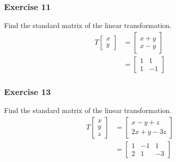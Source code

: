 \documentclass[letterpaper, 12pt]{math}
\begin{document}
\subsubsection*{Exercise 11}
Find the standard matrix of the linear transformation.
\begin{align*}
  T\begin{bmatrix}x \\ y\end{bmatrix} &=
    \begin{bmatrix}x+y \\ x-y\end{bmatrix} \\
  &= \begin{bmatrix}
    1 & 1 \\
    1 & -1
  \end{bmatrix}
\end{align*}

\subsubsection*{Exercise 13}
Find the standard matrix of the linear transformation.
\begin{align*}
  T\begin{bmatrix}x \\ y \\ z\end{bmatrix} &= \begin{bmatrix}
    x-y+z \\
    2x+y-3z
  \end{bmatrix} \\
  &= \begin{bmatrix}
    1 & -1 & 1 \\
    2 & 1 & -3
  \end{bmatrix}
\end{align*}
\end{document}
